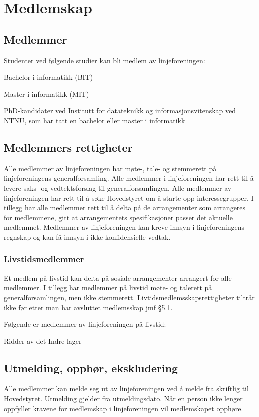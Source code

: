 \chapter{Medlemskap}

\section{Medlemmer}{
\label{chap:medlemskap}
Studenter ved følgende studier kan bli medlem av linjeforeningen: 
\begin{liste}
	\item Bachelor i informatikk (BIT)
	\item Master i informatikk (MIT)
    \item PhD-kandidater ved Institutt for datateknikk og informasjonsvitenskap ved NTNU, som har tatt en bachelor eller master i informatikk
\end{liste} 
}
\section{Medlemmers rettigheter}{
Alle medlemmer av linjeforeningen har møte-, tale- og stemmerett på linjeforeningens generalforsamling. Alle medlemmer i linjeforeningen har rett til å levere saks- og vedtektsforslag til generalforsamlingen. Alle medlemmer av linjeforeningen har rett til å søke Hovedstyret om å starte opp interessegrupper. I tillegg har alle medlemmer rett til å delta på de arrangementer som arrangeres for medlemmene, gitt at arrangementets spesifikasjoner passer det aktuelle medlemmet. Medlemmer av linjeforeningen kan kreve innsyn i linjeforeningens regnskap og kan få innsyn i ikke-konfidensielle vedtak. 
}

\subsection{Livstidsmedlemmer}{
Et medlem på livstid kan delta på sosiale arrangementer arrangert for alle medlemmer. I tillegg har medlemmer på livstid møte- og talerett på generalforsamlingen, men ikke stemmerett. Livtidsmedlemsskapsrettigheter tiltrår ikke før etter man har avsluttet medlemsskap jmf §5.1.

Følgende er medlemmer av linjeforeningen på livstid:
\begin{liste}
	\item Ridder av det Indre lager
\end{liste}

}
\section{Utmelding, opphør, ekskludering}
Alle medlemmer kan melde seg ut av linjeforeningen ved å melde fra skriftlig til Hovedstyret. Utmelding gjelder fra utmeldingsdato. Når en person ikke lenger oppfyller kravene for medlemskap i linjeforeningen vil medlemskapet opphøre.

